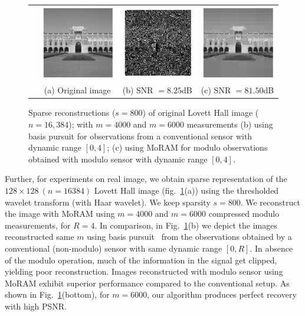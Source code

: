 \begin{figure}[t!]
\begin{center}
\begin{tabular}{cccc}
			\rotatebox{90}{$~~~~~~~m=6000$} &
			\includegraphics[width=0.32\linewidth]{./fig/lovett_original.pdf} &
			\includegraphics[width=0.32\linewidth]{./fig/lovett_r4_clip_6000.pdf} & 
			\includegraphics[width=0.32\linewidth]{./fig/lovett_r4_m_6000_s_800.pdf}  \\
			& \small{(a) Original image} & \small{(b) SNR $=8.25$dB} & %
			\small{(c) SNR $=81.50$dB} \\
		\end{tabular}
	\end{center}
	\caption{{Sparse reconstructions ($s=800$) of original Lovett Hall image ($n=16,384$); with $m=4000$ and $m=6000$ measurements (b) using basis pursuit for observations from a conventional sensor with dynamic range $[0,4]$; (c) using MoRAM for modulo observations obtained with modulo sensor with dynamic range $[0,4]$.}}
	\label{fig:lovett}
\end{figure}
Further, for experiments on real image, we obtain sparse representation of the $128 \times 128~(n=16384)$ Lovett Hall image (fig.~\ref{fig:lovett}(a)) using the thresholded wavelet transform (with Haar wavelet). We keep sparsity $s = 800$. We reconstruct the image with MoRAM using $m = 4000$ and $m=6000$ compressed modulo measurements, for $R =4$. In comparison, in Fig.~\ref{fig:lovett}(b) we depict the images reconstructed same $m$ using basis pursuit~\cite{chen2001atomic,spgl1:2007,BergFriedlander:2008} from the observations obtained by a conventional (non-modulo) sensor with same dynamic range $[0,R]$. In absence of the modulo operation, much of the information in the signal get clipped, yielding poor reconstruction. Images reconstructed with modulo sensor using MoRAM exhibit superior performance compared to the conventional setup. As shown in Fig.~\ref{fig:lovett}(bottom), for $m=6000$, our algorithm produces perfect recovery with high PSNR.
%


